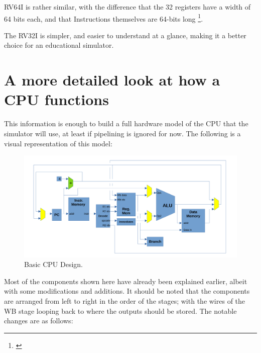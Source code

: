 \documentclass[12pt,twoside]{reedthesis}
\begin{document}
RV64I is rather similar, with the difference that the 32 registers have a width of 64 bits each, and that Instructions themselves are 64-bits long \footnote{\cite{waterman}}.

The RV32I is simpler, and easier to understand at a glance, making it a better choice for an educational simulator.

\break

\section{A more detailed look at how a CPU functions}

This information is enough to build a full hardware model of the CPU that the simulator will use, at least if pipelining is ignored for now. The following is a visual representation of this model:

\begin{figure}[h!]

	\centering
	\includegraphics[scale=0.5]{cpu_basic}
	\caption{Basic CPU Design.}
	\label{cpu-basic}
\end{figure}

Most of the components shown here have already been explained earlier, albeit with some modifications and additions. It should be noted that the components are arranged from left to right in the order of the stages; with the wires of the WB stage looping back to where the outputs should be stored. The notable changes are as follows:
\end{document}

